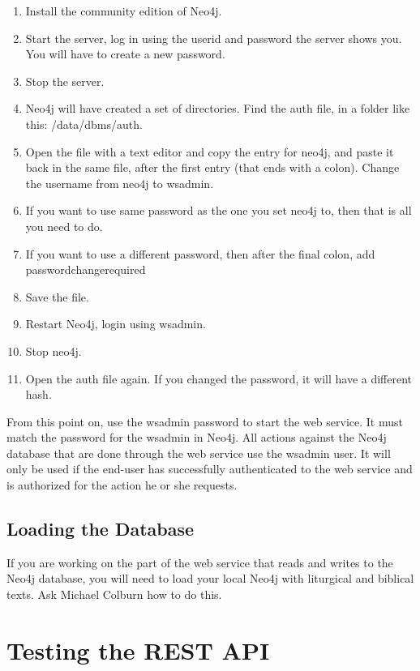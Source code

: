 \documentclass[]{memoir}
\begin{document}
\begin{enumerate}
    \item{Install the community edition of Neo4j.}
    \item{Start the server, log in using the userid and password the server shows you.  You will have to create a new password.}
    \item{Stop the server.}
    \item{Neo4j will have created a set of directories.  Find the auth file, in a folder like this: /data/dbms/auth.}
    \item{Open the file with a text editor and copy the entry for neo4j, and paste it back in the same file, after the first entry (that ends with a colon).  Change the username from neo4j to wsadmin.}
    \item{If you want to use same password as the one you set neo4j to, then that is all you need to do.}
    \item{If you want to use a different password, then after the final colon, add password\textunderscore change\textunderscore required}
    \item{Save the file.}
    \item{Restart Neo4j, login using wsadmin.}
    \item{Stop neo4j.}
    \item{Open the auth file again.  If you changed the password, it will have a different hash.}
\end{enumerate}

From this point on, use the wsadmin password to start the web service.  It must match the password for the wsadmin in Neo4j. All actions against the Neo4j database that are done through the web service use the wsadmin user.  It will only be used if the end-user has successfully authenticated to the web service and is authorized for the action he or she requests.

\section{Loading the Database}

If you are working on the part of the web service that reads and writes to the Neo4j database, you will need to load your local Neo4j with liturgical and biblical texts.  Ask Michael Colburn how to do this.

\chapter{Testing the REST API}
\end{document}
